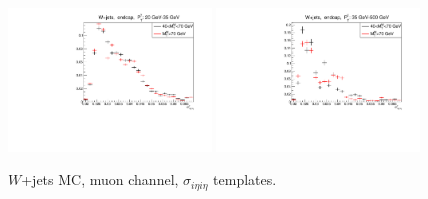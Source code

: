 \begin{figure}[htb]
\begin{center}
  \includegraphics[width=0.48\textwidth]{../figs/figs_v11/MUON_WGamma/QuickChecks/cTemplatesVsWMt_Wjets_phoSigmaIEtaIEta_ENDCAP_pt20to35.pdf} \includegraphics[width=0.48\textwidth]{../figs/figs_v11/MUON_WGamma/QuickChecks/cTemplatesVsWMt_Wjets_phoSigmaIEtaIEta_ENDCAP_pt35to500.pdf}\\
  \caption{$W$+jets MC, muon channel, $\sigma_{i \eta i \eta}$ templates.}
  \label{fig:templatesVsWMt_Wjets_SIHIH}
  \end{center}
\end{figure}


